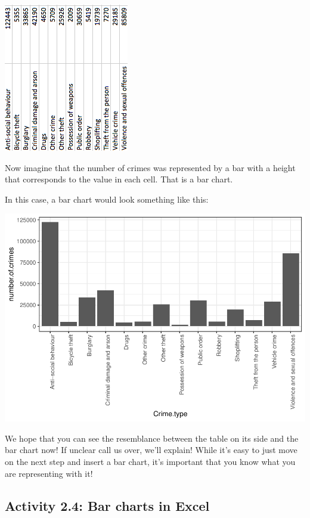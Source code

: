 \documentclass[
]{book}
\begin{document}
\includegraphics{imgs/table_on_side.png}

Now imagine that the number of crimes was represented by a bar with a height that corresponds to the value in each cell. That is a bar chart.

In this case, a bar chart would look something like this:

\includegraphics{bookdown-demo_files/figure-latex/unnamed-chunk-15-1.pdf}

We hope that you can see the resemblance between the table on its side and the bar chart now! If unclear call us over, we'll explain! While it's easy to just move on the next step and insert a bar chart, it's important that you know what you are representing with it!

\hypertarget{activity-2.4-bar-charts-in-excel}{%
\subsection{Activity 2.4: Bar charts in Excel}\label{activity-2.4-bar-charts-in-excel}}
\end{document}
